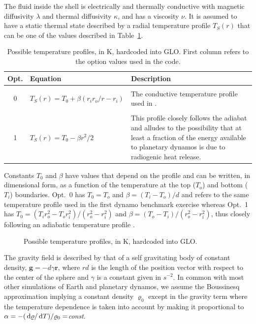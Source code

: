 \documentclass[a4paper,10pt]{book}
\newcommand{\de}{{\rm \, d}}
\renewcommand{\vec}[1]{\mathbf{#1}}
\begin{document}
The fluid inside the shell is electrically and thermally conductive with
magnetic diffusivity $\lambda$ and thermal diffusivity $\kappa$, and has a
viscosity $\nu$. It is assumed to have a static thermal state described by a
radial temperature profile $T_S (r)$ that can be one of the values described in
Table~\ref{t:t_profiles}.
\begin{table}[htb]
\centering
\begin{tabular}{|c|lp{}|}\hline
 Opt. & Equation & Description\\\hline
  &                          & \\
 0&$T_S(r) = T_0 + \beta(r_i r_o/r - r_i)$ & The conductive temperature
 profile used in \citep{ChristensenEtAl01}.
 \\\hline
  &                          & \\
 1&$T_S(r) = T_0 - \beta r^2/2$    & This profile closely
follows the adiabat \citep{LabrossePoirier1997,DaviesGubbins2011} and alludes to
the possibility that at least a fraction of the energy available to planetary
dynamos is due to radiogenic heat release. \\ \hline
\end{tabular}
\caption{Possible temperature profiles, in K, hardcoded into GLO. First column
refers to the option values used in the code.}
\label{t:t_profiles}
\end{table}

Constants $T_0$ and $\beta$ have values that depend on the profile and can be
written, in dimensional form, as a function of the temperature at the top
($T_o$) and bottom ($T_i$) boundaries. Opt.~0 has $T_0 = T_o$ and $\beta = (T_i
-T_o)/d$ and refers to the same temperature profile used in the first dynamo
benchmark exercise \citep{ChristensenEtAl01} whereas Opt.~1 has $T_0 = (T_i
r_o^2 - T_o r_i^2)/(r_o^2 - r_i^2)$ and $\beta = (T_o - T_i)/(r_o^2 - r_i^2)$,
thus closely following an adiabatic temperature profile
\citep{LabrossePoirier1997, DaviesGubbins2011}.

\begin{figure}[htb]
\centering
 
 \caption{Possible temperature profiles, in K, hardcoded into GLO.}
\end{figure}

The gravity field is described by that of a self gravitating body of constant
density, $\vec g = - d \gamma \vec r$, where $rd$ is the length of the position
vector with respect to the center of the sphere and $\gamma$ is a constant given
in $s^{-2}$. In common with most other simulations of Earth and planetary
dynamos, we assume the Boussinesq approximation implying a constant density
$\varrho_0$ except in the gravity term where the temperature dependence is taken
into account by making it proportional to $\alpha = - ( \de\varrho/\de
T)/\varrho_0 =${\sl const}.
\end{document}
